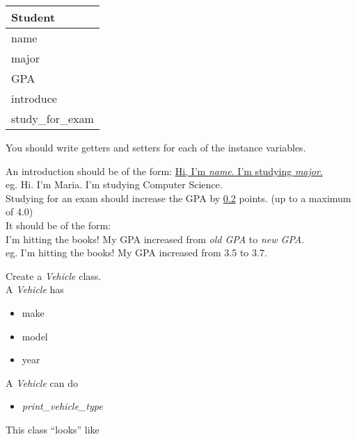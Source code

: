 \documentclass{article}
\newcommand{\tab}{\hspace*{0.25in}}
\begin{document}
\begin{enumerate}
\begin{minipage}{.4\textwidth}
		\vspace*{1em}
		\begin{tabular}{|l|}
			\hline Student\\ \hline
			name\\ major\\ GPA\\ \hline
			introduce\\ study\_for\_exam \\  \hline
		\end{tabular}
	\end{minipage}

	\vspace*{2ex}
	You should write getters and setters for each of the instance variables.\

	An introduction should be of the form: \underline{Hi, I'm  \textit{name}.  
	I'm studying \textit{major}.}\\
	\tab \tab eg. Hi. I'm Maria. I'm studying Computer Science.\\

	Studying for an exam should increase the GPA by \underline{0.2} points. (up to a maximum of 4.0)\\  
	It should be of the form: \\
	I'm hitting the books! My GPA increased from \textit{old GPA} to \textit{new GPA}.\\
	\tab \tab eg. I'm hitting the books! My GPA increased from 3.5 to 3.7.\\




	\begin{minipage}{.6\textwidth}	
	\item Create a \textit{Vehicle} class.\\
		A \textit{Vehicle} has
		\begin{itemize}
			\item make 
			\item model
			\item year	
		\end{itemize}
		
		A \textit{Vehicle} can do
		\begin{itemize}
			\item \textit{print\_vehicle\_type}
		\end{itemize}
	\end{minipage}
	\begin{minipage}{.4\textwidth}
		This class ``looks'' like 
				

\end{minipage}
\end{enumerate}
\end{document}
